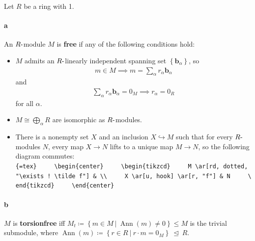 \begin{solution}

Let \(R\) be a ring with 1.

\hypertarget{a-92}{%
\paragraph{a}\label{a-92}}

An \(R{\hbox{-}}\)module \(M\) is \textbf{free} if any of the following
conditions hold:

\begin{itemize}
\tightlist
\item
  \(M\) admits an \(R{\hbox{-}}\)linearly independent spanning set
  \(\left\{{\mathbf{b}_\alpha}\right\}\), so
  \begin{align*}m\in M \implies m = \sum_\alpha r_\alpha \mathbf{b}_\alpha\end{align*}
  and
  \begin{align*}\sum_\alpha r_\alpha \mathbf{b}_\alpha = 0_M \implies r_\alpha = 0_R\end{align*}
  for all \(\alpha\).
\item
  \(M \cong \bigoplus_{\alpha} R\) are isomorphic as
  \(R{\hbox{-}}\)modules.
\item
  There is a nonempty set \(X\) and an inclusion \(X\hookrightarrow M\)
  such that for every \(R{\hbox{-}}\)modules \(N\), every map \(X\to N\)
  lifts to a unique map \(M\to N\), so the following diagram commutes:
  \texttt{\{=tex\}\ \ \ \ \ \textbackslash{}begin\{center\}\ \ \ \ \ \textbackslash{}begin\{tikzcd\}\ \ \ \ \ M\ \textbackslash{}ar{[}rd,\ dotted,\ "\textbackslash{}exists\ !\ \textbackslash{}tilde\ f"{]}\ \&\ \textbackslash{}\textbackslash{}\ \ \ \ \ X\ \textbackslash{}ar{[}u,\ hook{]}\ \textbackslash{}ar{[}r,\ "f"{]}\ \&\ N\ \ \ \ \ \textbackslash{}end\{tikzcd\}\ \ \ \ \ \textbackslash{}end\{center\}}
\end{itemize}

\hypertarget{b-82}{%
\paragraph{b}\label{b-82}}

\(M\) is \textbf{torsionfree} iff
\(M_t \coloneqq\left\{{m\in M {~\mathrel{\Big|}~}\operatorname{Ann}(m) \neq 0}\right\} \leq M\)
is the trivial submodule, where
\(\operatorname{Ann}(m) \coloneqq\left\{{r\in R {~\mathrel{\Big|}~}r\cdot m = 0_M}\right\} {~\trianglelefteq~}R\).

\hypertarget{c-54}{%
}
\end{solution}
